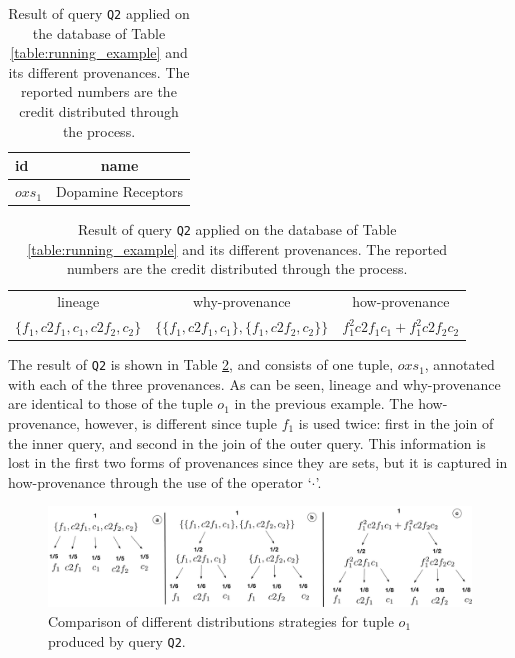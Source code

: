\begin{table}[]
\centering
  \begin{tabular}{|l||c|}
  \hline
    id & name\\
    \hline
    $oxs_1$ &  Dopamine Receptors\\
    \hline
  \end{tabular}
  \newline
\vspace{2mm}
  \begin{tabular}{c | c | c}
  	lineage & why-provenance & how-provenance   \\
  	$\{f_1, c2f_1, c_1, c2f_2, c_2\}$ & $\{\{f_1, c2f_1, c_1\}, \{f_1, c2f_2, c_2\}\}$ & $f_1^2 c2f_1 c_1 + f_1^2 c2f_2 c_2$\\
  \end{tabular}
    \caption{Result of query \texttt{Q2} applied on the database of Table \ref{table:running_example} and its different provenances. The reported numbers are the credit distributed through the process.}
  \label{table:difference_result}
\end{table}

The result of \texttt{Q2} is shown in Table \ref{table:difference_result}, and consists of one tuple, $oxs_1$, annotated with each of the three provenances. As can be seen, lineage and why-provenance are identical to those of the tuple $o_1$ in the previous example. 
The how-provenance, however, is different since tuple $f_1$ is used twice: first in the join of the inner query, and second in the join of the outer query. This information is lost in the first two forms of provenances since they are sets, but it is captured in how-provenance through the use of the operator `$\cdot$'.


\begin{figure}[]
  \includegraphics[width=\textwidth]{figures/how_distribution}
  \caption{Comparison of different distributions strategies for tuple $o_1$ produced by query \texttt{Q2}.}
  \label{figure:distributions_differences}
\end{figure}


